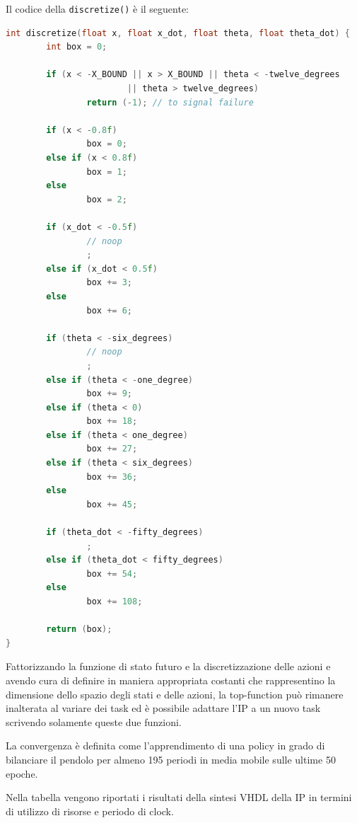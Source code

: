 \documentclass{article}
\begin{document}
Il codice della \texttt{discretize()} è il seguente:
\begin{lstlisting}[language=C++]
int discretize(float x, float x_dot, float theta, float theta_dot) {
        int box = 0;

        if (x < -X_BOUND || x > X_BOUND || theta < -twelve_degrees
                        || theta > twelve_degrees)
                return (-1); // to signal failure

        if (x < -0.8f)
                box = 0;
        else if (x < 0.8f)
                box = 1;
        else
                box = 2;

        if (x_dot < -0.5f)
                // noop
                ;
        else if (x_dot < 0.5f)
                box += 3;
        else
                box += 6;

        if (theta < -six_degrees)
                // noop
                ;
        else if (theta < -one_degree)
                box += 9;
        else if (theta < 0)
                box += 18;
        else if (theta < one_degree)
                box += 27;
        else if (theta < six_degrees)
                box += 36;
        else
                box += 45;

        if (theta_dot < -fifty_degrees)
                ;
        else if (theta_dot < fifty_degrees)
                box += 54;
        else
                box += 108;

        return (box);
}
\end{lstlisting}

Fattorizzando la funzione di stato futuro e la discretizzazione delle azioni e avendo cura di definire in maniera appropriata costanti che rappresentino la dimensione dello spazio degli stati e delle azioni, la top-function può rimanere inalterata al variare dei task ed è possibile adattare l'IP a un nuovo task scrivendo solamente queste due funzioni. 

La convergenza è definita come l'apprendimento di una policy in grado di bilanciare il pendolo per almeno 195 periodi in media mobile sulle ultime 50 epoche. 

Nella tabella  vengono riportati i risultati della sintesi VHDL della IP in termini di utilizzo di risorse e periodo di clock. 
\end{document}
